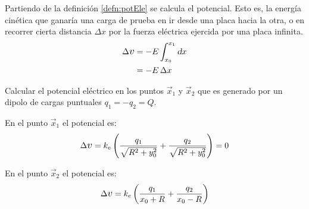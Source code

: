 \begin{mdframed}[style=ExampleFrame]
    \begin{example}
    \end{example}
    Partiendo de la definición \ref{defn:potEle} se calcula el potencial.
    Esto es, la energía cinética que ganaría una carga de prueba en ir desde una placa hacia la otra, o en recorrer cierta distancia $\Delta x$ por la fuerza eléctrica ejercida por una placa infinita.
    \begin{align*}
        \Delta \voltage &= - E \int_{x_0}^{x_1} \dif x
        \\
        &= - E \, \Delta x
    \end{align*}
\end{mdframed}

\begin{mdframed}[style=ExampleFrame]
    \begin{example}
    \end{example}
    \begin{formatI}
        Calcular el potencial eléctrico en los puntos $\vec{x}_1$ y $\vec{x}_2$ que es generado por un dipolo de cargas puntuales $q_1=-q_2=Q$.
    \end{formatI}
    \begin{center}
        \def\svgwidth{0.7\linewidth}
        
    \end{center}
    En el punto $\vec{x}_1$ el potencial es:
    \begin{equation*}
        \Delta \voltage = \cstcoulomb \inParentheses{\frac{q_1}{\sqrt{R^2 + y_0^2}} + \frac{q_2}{\sqrt{R^2 + y_0^2}}} = 0
    \end{equation*}

    En el punto $\vec{x}_2$ el potencial es:
    \begin{equation*}
        \Delta \voltage = \cstcoulomb \inParentheses{\frac{q_1}{x_0 + R} + \frac{q_2}{x_0 - R}}
    \end{equation*}
\end{mdframed}


